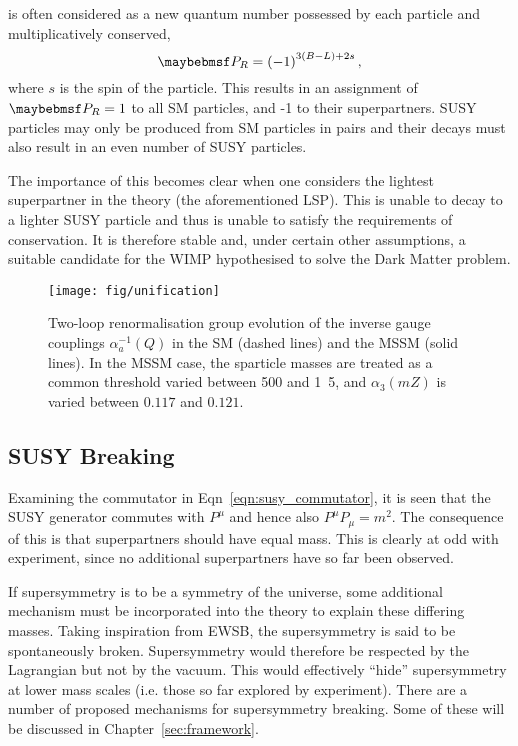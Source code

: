 \Rparity is often considered as a new quantum number possessed by each particle
and multiplicatively conserved,
\begin{equation*}
\PR = \left(-1\right)^{3(B-L)+2s},
\end{equation*}
where $s$ is the spin of the particle. This results in an assignment of $\PR =
1$ to all \ac{SM} particles, and -1 to their superpartners. \ac{SUSY} particles
may only be produced from \ac{SM} particles in pairs and their decays must also
result in an even number of \ac{SUSY} particles.

The importance of this becomes clear when one considers the lightest
superpartner in the theory (the aforementioned \ac{LSP}). This is unable to
decay to a lighter \ac{SUSY} particle and thus is unable to satisfy the
requirements of \Rparity conservation. It is therefore stable and, under certain
other assumptions, a suitable candidate for the \ac{WIMP} hypothesised to solve
the Dark Matter problem.

\begin{figure}
\centering
\texttt{[image: fig/unification]}
\caption{Two-loop renormalisation group evolution of the inverse gauge couplings
  $\alpha_a^{−1}(Q)$ in the \ac{SM} (dashed lines) and the MSSM (solid
  lines). In the MSSM case, the sparticle masses are treated as a common
  threshold varied between \unit{500}{\GeV} and \unit{1.5}{\TeV}, and
  $\alpha_3(mZ)$ is varied between $0.117$ and $0.121$.~\cite{susy_primer}}
\label{fig:susy_gauge_unification}
\end{figure}

\subsection{\ac{SUSY} Breaking}
Examining the commutator in Eqn~\ref{eqn:susy_commutator}, it is seen that the
\ac{SUSY} generator \Qa commutes with $P^{\mu}$ and hence also $P^{\mu}P_{\mu} =
m^2$. The consequence of this is that superpartners should have equal mass. This
is clearly at odd with experiment, since no additional superpartners have so far
been observed.

If supersymmetry is to be a symmetry of the universe, some additional mechanism
must be incorporated into the theory to explain these differing masses. Taking
inspiration from \ac{EWSB}, the supersymmetry is said to be spontaneously
broken. Supersymmetry would therefore be respected by the Lagrangian but not by
the vacuum. This would effectively ``hide'' supersymmetry at lower mass scales
(i.e. those so far explored by experiment). There are a number of proposed
mechanisms for supersymmetry breaking. Some of these will be discussed in
Chapter~\ref{sec:framework}.

